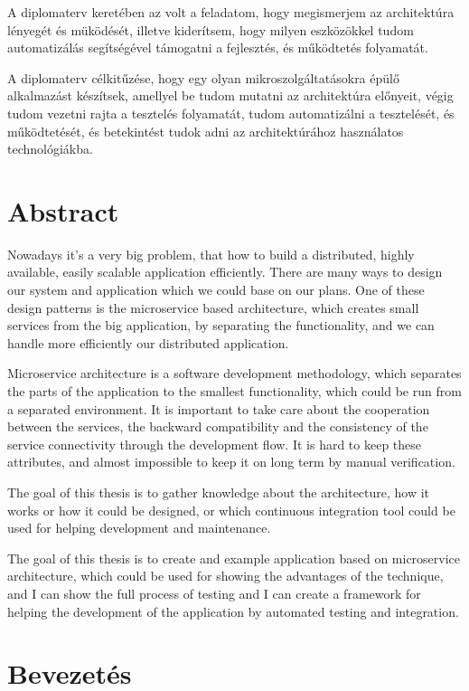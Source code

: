 \documentclass[11pt,magyar,a4paper,twoside,]{report}
\begin{document}
A diplomaterv keretében az volt a feladatom, hogy megismerjem az
architektúra lényegét és müködését, illetve kiderítsem, hogy milyen
eszközökkel tudom automatizálás segítségével támogatni a fejlesztés, és
működtetés folyamatát.

A diplomaterv célkitűzése, hogy egy olyan mikroszolgáltatásokra épülő
alkalmazást készítsek, amellyel be tudom mutatni az architektúra
előnyeit, végig tudom vezetni rajta a tesztelés folyamatát, tudom
automatizálni a tesztelését, és működtetését, és betekintést tudok adni
az architektúrához használatos technológiákba.

\chapter*{Abstract}\label{abstract}

Nowadays it's a very big problem, that how to build a distributed,
highly available, easily scalable application efficiently. There are
many ways to design our system and application which we could base on
our plans. One of these design patterns is the microservice based
architecture, which creates small services from the big application, by
separating the functionality, and we can handle more efficiently our
distributed application.

Microservice architecture is a software development methodology, which
separates the parts of the application to the smallest functionality,
which could be run from a separated environment. It is important to take
care about the cooperation between the services, the backward
compatibility and the consistency of the service connectivity through
the development flow. It is hard to keep these attributes, and almost
impossible to keep it on long term by manual verification.

The goal of this thesis is to gather knowledge about the architecture,
how it works or how it could be designed, or which continuous
integration tool could be used for helping development and maintenance.

The goal of this thesis is to create and example application based on
microservice architecture, which could be used for showing the
advantages of the technique, and I can show the full process of testing
and I can create a framework for helping the development of the
application by automated testing and integration.

\chapter{Bevezetés}\label{bevezetuxe9s}
\end{document}
